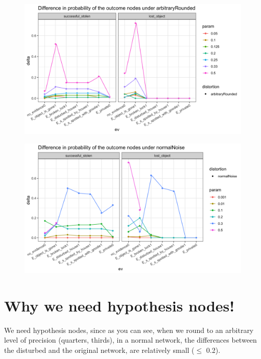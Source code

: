 \documentclass[11pt]{amsart}
\begin{document}
\begin{figure}[htbp]
\begin{center}
\includegraphics[scale=0.17]{images/arbitraryRoundeddelta.png}
\label{default}
\end{center}
\end{figure}

\begin{figure}[htbp]
\begin{center}
\includegraphics[scale=0.17]{images/normalNoisedelta.png}
\label{default}
\end{center}
\end{figure}


\clearpage

\section{Why we need hypothesis nodes!}
We need hypothesis nodes, since as you can see, when we round to an arbitrary level of precision (quarters, thirds), in a normal network, the differences between the disturbed and the original network, are relatively small ($\leq$ 0.2). 
\end{document}
